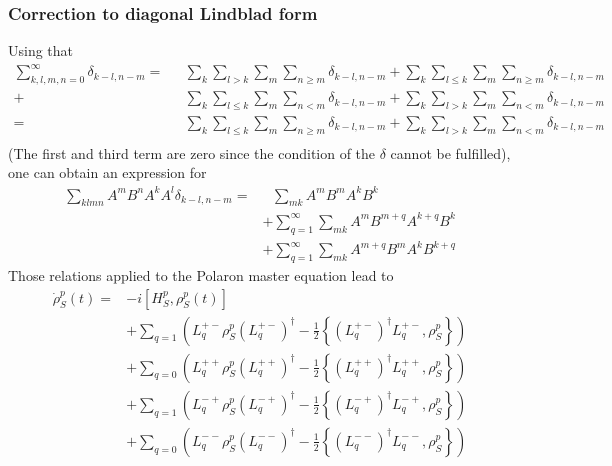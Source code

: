 	\subsubsection{Correction to diagonal Lindblad form}
	Using that
	\begin{align*}
		\sum_{k,l,m,n=0}^{\infty} \delta_{k-l, n-m} = ~~~&\sum_{k}^{} \sum_{l > k}^{} \sum_{m}^{} \sum_{n \geq m}^{} \delta_{k-l, n-m} + \sum_{k}^{} \sum_{l \leq k}^{} \sum_{m}^{} \sum_{n \geq m}^{} \delta_{k-l, n-m} \\
		+ &\sum_{k}^{} \sum_{l \leq k}^{} \sum_{m}^{} \sum_{n < m}^{} \delta_{k-l, n-m} + \sum_{k}^{} \sum_{l > k}^{} \sum_{m}^{} \sum_{n < m}^{} \delta_{k-l, n-m} \\
		=~~~&\sum_{k}^{} \sum_{l \leq k}^{} \sum_{m}^{} \sum_{n \geq m}^{} \delta_{k-l, n-m} + \sum_{k}^{} \sum_{l > k}^{} \sum_{m}^{} \sum_{n < m}^{} \delta_{k-l, n-m} \\
	\end{align*}
	(The first and third term are zero since the condition of the $\delta$ cannot be fulfilled), one can obtain an expression for
	\begin{align*}
		\sum_{klmn}^{} A^m B^n A^k A^l \delta_{k-l, n-m} =	&~~~\sum_{mk}^{} A^m B^m A^k B^k \\
		&+\sum_{q=1}^{\infty}\sum_{mk}^{} A^m B^{m+q} A^{k+q} B^k \\
		&+\sum_{q=1}^{\infty}\sum_{mk}^{} A^{m+q}  B^{m} A^k B^{k+q}
	\end{align*}
	Those relations applied to the Polaron master equation lead to
	\begin{align*}
		\dot{\rho}_S^p(t) = &-i \left[H_S^p,  {\rho}_S^p(t)\right] \\
		&+\sum_{q=1}^{}  \left(L_q^{+-} \rho_S^p \left(L_q^{+-}\right)^\dagger - \frac{1}{2} \left\{\left(L_q^{+-}\right)^\dagger L_q^{+-}, \rho_S^p \right\}\right) \\
		&+\sum_{q=0}^{}  \left(L_q^{++} \rho_S^p \left(L_q^{++}\right)^\dagger - \frac{1}{2} \left\{\left(L_q^{++}\right)^\dagger L_q^{++}, \rho_S^p \right\}\right) \\
		&+\sum_{q=1}^{}  \left(L_q^{-+} \rho_S^p \left(L_q^{-+}\right)^\dagger - \frac{1}{2} \left\{\left(L_q^{-+}\right)^\dagger L_q^{-+}, \rho_S^p \right\}\right) \\
		&+\sum_{q=0}^{}  \left(L_q^{--} \rho_S^p \left(L_q^{--}\right)^\dagger - \frac{1}{2} \left\{\left(L_q^{--}\right)^\dagger L_q^{--}, \rho_S^p \right\}\right) \\
	\end{align*}
